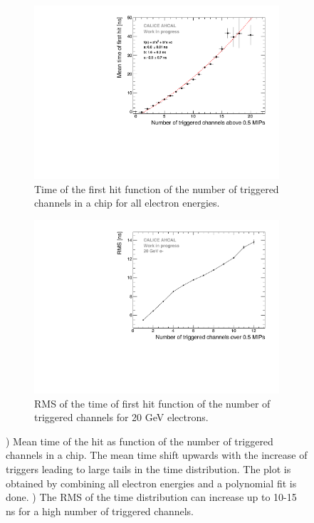 \begin{figure}[htbp!]
	\begin{subfigure}[t]{0.5\textwidth}
		\centering
		\includegraphics[width=1\textwidth]{chap5/fig_AHCAL_timing/Electrons/NumberHits_Dependance_AllEnergies.pdf}
		\caption{Time of the first hit function of the number of triggered channels in a chip for all electron energies.}\label{fig:nhits_profile}
	\end{subfigure}
	\hfill
	\begin{subfigure}[t]{0.5\textwidth}
		\centering
		\includegraphics[width=1\textwidth]{chap5/fig_AHCAL_timing/Electrons/ParametrisationPedestalShift_20GeV.pdf}
		\caption{RMS of the time of first hit function of the number of triggered channels for 20 GeV electrons.}\label{fig:RMS_nHits}
	\end{subfigure}
	\caption{) Mean time of the hit as function of the number of triggered channels in a chip. The mean time shift upwards with the increase of triggers leading to large tails in the time distribution. The plot is obtained by combining all electron energies and a polynomial fit is done. ) The RMS of the time distribution can increase up to 10-15 ns for a high number of triggered channels.}
\end{figure}

